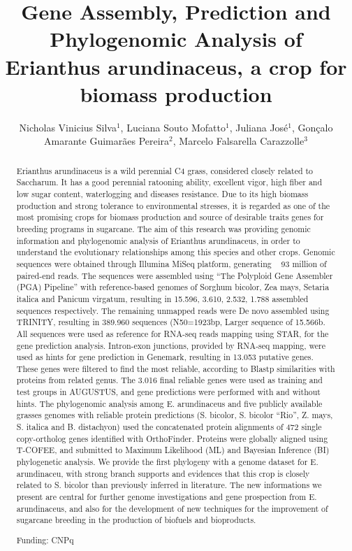 \documentclass[twoside]{article}
\title{\vspace{-15mm}\fontsize{24pt}{10pt}\selectfont\textbf{Gene Assembly, Prediction and Phylogenomic Analysis of Erianthus arundinaceus, a crop for biomass production}} %
\author{Nicholas Vinicius Silva$^1$, Luciana Souto Mofatto$^1$, Juliana Jos\'e$^1$, Gon\c{c}alo Amarante Guimar\~aes Pereira$^2$, Marcelo Falsarella Carazzolle$^3$}
\affil{1 UNICAMP\\ 2 BRAZILIAN BIOETHANOL SCIENCE AND TECHNOLOGY LABORATORY, BRAZILIAN CENTER FOR RESEARCH IN ENERGY AND MATERIALS, BIOLOGY INSTITUTE - UNICAMP\\ 3 BIOLOGY INSTITUTE - UNICAMP, NATIONAL CENTER FOR HIGH PERFORMANCE COMPUTING\\ }
\date{}
\begin{document}
\maketitle %

\thispagestyle{fancy} %


\begin{abstract}
Erianthus arundinaceus is a wild perennial C4 grass, considered closely related to Saccharum. It has a good perennial ratooning ability, excellent vigor, high fiber and low sugar content, waterlogging and diseases resistance. Due to its high biomass production and strong tolerance to environmental stresses, it is regarded as one of the most promising crops for biomass production and source of desirable traits genes for breeding programs in sugarcane. The aim of this research was providing genomic information and phylogenomic analysis of Erianthus arundinaceus, in order to understand the evolutionary relationships among this species and other crops. Genomic sequences were obtained through Illumina MiSeq platform, generating ~ 93 million of paired-end reads. The sequences were assembled using ``The Polyploid Gene Assembler (PGA) Pipeline'' with reference-based genomes of Sorghum bicolor, Zea mays, Setaria italica and Panicum virgatum, resulting in 15.596, 3.610, 2.532, 1.788 assembled sequences respectively. The remaining unmapped reads were De novo assembled using TRINITY, resulting in 389.960 sequences (N50=1923bp, Larger sequence of 15.566b. All sequences were used as reference for RNA-seq reads mapping using STAR, for the gene prediction analysis. Intron-exon junctions, provided by RNA-seq mapping, were used as hints for gene prediction in Genemark, resulting in 13.053 putative genes. These genes were filtered to find the most reliable, according to Blastp similarities with proteins from related genus. The 3.016 final reliable genes were used as training and test groups in AUGUSTUS, and gene predictions were performed with and without hints. The phylogenomic analysis among E. arundinaceus and five publicly available grasses genomes with reliable protein predictions (S. bicolor, S. bicolor ``Rio'', Z. mays, S. italica and B. distachyon) used the concatenated protein alignments of 472 single copy-ortholog genes identified with OrthoFinder. Proteins were globally aligned using T-COFEE, and submitted to Maximum Likelihood (ML) and Bayesian Inference (BI) phylogenetic analysis. We provide the first phylogeny with a genome dataset for E. arundinaceu, with strong branch supports and evidences that this crop is closely related to S. bicolor than previously inferred in literature. The new informations we present are central for further genome investigations and gene prospection from E. arundinaceus, and also for the development of new techniques for the improvement of sugarcane breeding in the production of biofuels and bioproducts.

Funding: CNPq
\end{abstract}
\end{document}
